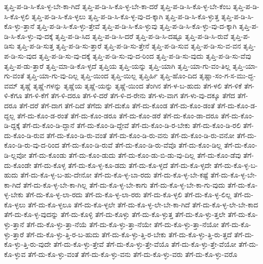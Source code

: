 {ತೃಪ್ತಿ-ಪ-ಡಿ-ಸಿ-ಕೊ-ಳ್ಳ-ಬೇ-ಕಾ-ಗಿದೆ
ತೃಪ್ತಿ-ಪ-ಡಿ-ಸಿ-ಕೊ-ಳ್ಳ-ಬೇ-ಕಾ-ದರೆ
ತೃಪ್ತಿ-ಪ-ಡಿ-ಸಿ-ಕೊ-ಳ್ಳ-ಬೇ-ಕೆಂಬ
ತೃಪ್ತಿ-ಪ-ಡಿ-ಸಿ-ಕೊ-ಳ್ಳಲಿ
ತೃಪ್ತಿ-ಪ-ಡಿ-ಸಿ-ಕೊ-ಳ್ಳಲು
ತೃಪ್ತಿ-ಪ-ಡಿ-ಸಿ-ಕೊ-ಳ್ಳ-ವು-ದ-ಕ್ಕಾಗಿ
ತೃಪ್ತಿ-ಪ-ಡಿ-ಸಿ-ಕೊ-ಳ್ಳುತ್ತ
ತೃಪ್ತಿ-ಪ-ಡಿ-ಸಿ-ಕೊ-ಳ್ಳು-ತ್ತಾನೆ
ತೃಪ್ತಿ-ಪ-ಡಿ-ಸಿ-ಕೊ-ಳ್ಳು-ತ್ತೇವೆ
ತೃಪ್ತಿ-ಪ-ಡಿ-ಸಿ-ಕೊ-ಳ್ಳುವು
ತೃಪ್ತಿ-ಪ-ಡಿ-ಸಿ-ಕೊ-ಳ್ಳು-ವು-ದ-ಕ್ಕಾಗಿ
ತೃಪ್ತಿ-ಪ-ಡಿ-ಸಿ-ಕೊ-ಳ್ಳು-ವು-ದಕ್ಕೆ
ತೃಪ್ತಿ-ಪ-ಡಿ-ಸಿದ
ತೃಪ್ತಿ-ಪ-ಡಿ-ಸಿ-ದರೆ
ತೃಪ್ತಿ-ಪ-ಡಿ-ಸಿ-ದಷ್ಟೂ
ತೃಪ್ತಿ-ಪ-ಡಿ-ಸಿ-ರುವೆ
ತೃಪ್ತಿ-ಪ-ಡಿಸು
ತೃಪ್ತಿ-ಪ-ಡಿ-ಸುತ್ತ
ತೃಪ್ತಿ-ಪ-ಡಿ-ಸು-ತ್ತಾರೆ
ತೃಪ್ತಿ-ಪ-ಡಿ-ಸು-ತ್ತೇನೆ
ತೃಪ್ತಿ-ಪ-ಡಿ-ಸುವ
ತೃಪ್ತಿ-ಪ-ಡಿ-ಸು-ವ-ವನ
ತೃಪ್ತಿ-ಪ-ಡಿ-ಸು-ವುದ
ತೃಪ್ತಿ-ಪ-ಡಿ-ಸು-ವು-ದಕ್ಕೆ
ತೃಪ್ತಿ-ಪ-ಡಿ-ಸು-ವು-ದ-ರಿಂದ
ತೃಪ್ತಿ-ಪ-ಡಿ-ಸು-ವುದು
ತೃಪ್ತಿ-ಪ-ಡಿ-ಸು-ವೆವು
ತೃಪ್ತಿ-ಪ-ಡು-ತ್ತಾರೆ
ತೃಪ್ತಿ-ಮಾ-ಡಿ-ಕೊ-ಳ್ಳದೆ
ತೃಪ್ತಿಯ
ತೃಪ್ತಿ-ಯನ್ನು
ತೃಪ್ತಿ-ಯಾಗಿ
ತೃಪ್ತಿ-ಯಾ-ಗು-ವಂ-ತಿಲ್ಲ
ತೃಪ್ತಿ-ಯಾ-ಗು-ವಂತೆ
ತೃಪ್ತಿ-ಯಾ-ಗು-ವು-ದಿಲ್ಲ
ತೃಪ್ತಿ-ಯಿಂದ
ತೃಪ್ತಿ-ಯಿಲ್ಲ
ತೃಪ್ತಿರ್ಹಿ
ತೃಪ್ತಿ-ಹೊಂ-ದಿದ
ತೃಷ್ಣಾ-ಸಂ-ಗ-ಸ-ಮು-ದ್ಭ-ವಮ್
ತೃಷ್ಣೆ
ತೃಷ್ಣೆ-ಗಳನ್ನು
ತೃಷ್ಣೆಯ
ತೃಷ್ಣೆ-ಯನ್ನು
ತೃಷ್ಣೆ-ಯಿಂದ
ತೆಂಗಿನ
ತೆಗ-ಳ-ಬ-ಹುದು
ತೆಗ-ಳಲಿ
ತೆಗ-ಳಿಕೆ
ತೆಗ-ಳಿ-ಕೆಗೂ
ತೆಗ-ಳಿ-ಕೆಗೆ
ತೆಗ-ಳಿ-ದರೂ
ತೆಗ-ಳಿ-ದರೆ
ತೆಗ-ಳಿ-ದ-ರೇನು
ತೆಗ-ಳು-ವಾಗ
ತೆಗ-ಳು-ವು-ದಕ್ಕೂ
ತೆಗೆದ
ತೆಗೆ-ದರೂ
ತೆಗೆ-ದರೆ
ತೆಗೆ-ದಾಗ
ತೆಗೆ-ದಿದೆ
ತೆಗೆದು
ತೆಗೆ-ದುಕೊ
ತೆಗೆ-ದು-ಕೊಂಡ
ತೆಗೆ-ದು-ಕೊಂ-ಡಂತೆ
ತೆಗೆ-ದು-ಕೊಂ-ಡ-ದ್ದಲ್ಲ
ತೆಗೆ-ದು-ಕೊಂ-ಡ-ರಂತೆ
ತೆಗೆ-ದು-ಕೊಂ-ಡರೂ
ತೆಗೆ-ದು-ಕೊಂ-ಡರೆ
ತೆಗೆ-ದು-ಕೊಂ-ಡಾ-ದರೂ
ತೆಗೆ-ದು-ಕೊಂ-ಡಿ-ದ್ದಕ್ಕೆ
ತೆಗೆ-ದು-ಕೊಂ-ಡಿ-ದ್ದಾನೆ
ತೆಗೆ-ದು-ಕೊಂ-ಡಿ-ದ್ದೇವೆ
ತೆಗೆ-ದು-ಕೊಂ-ಡಿ-ರ-ಬೇಕು
ತೆಗೆ-ದು-ಕೊಂ-ಡಿ-ರಲಿ
ತೆಗೆ-ದು-ಕೊಂ-ಡಿ-ರುವ
ತೆಗೆ-ದು-ಕೊಂ-ಡಿ-ರು-ವಂತೆ
ತೆಗೆ-ದು-ಕೊಂ-ಡಿ-ರು-ವನು
ತೆಗೆ-ದು-ಕೊಂ-ಡಿ-ರು-ವನೋ
ತೆಗೆ-ದು-ಕೊಂ-ಡಿ-ರು-ವು-ದ-ರಿಂದ
ತೆಗೆ-ದು-ಕೊಂ-ಡಿ-ರುವೆ
ತೆಗೆ-ದು-ಕೊಂ-ಡಿ-ರು-ವೆವೊ
ತೆಗೆ-ದು-ಕೊಂ-ಡಿಲ್ಲ
ತೆಗೆ-ದು-ಕೊಂ-ಡಿ-ಲ್ಲವೋ
ತೆಗೆ-ದು-ಕೊಂಡು
ತೆಗೆ-ದು-ಕೊಂ-ಡುದು
ತೆಗೆ-ದು-ಕೊಂ-ಡು-ಬಿ-ಡು-ವು-ದಿಲ್ಲ
ತೆಗೆ-ದು-ಕೊಂ-ಡೆವು
ತೆಗೆ-ದು-ಕೊಂಡೇ
ತೆಗೆ-ದು-ಕೊಳ್ಳ
ತೆಗೆ-ದು-ಕೊ-ಳ್ಳ-ಕೂ-ಡದು
ತೆಗೆ-ದು-ಕೊ-ಳ್ಳದೆ
ತೆಗೆ-ದು-ಕೊ-ಳ್ಳದೇ
ತೆಗೆ-ದು-ಕೊ-ಳ್ಳ-ಬ-ಹುದು
ತೆಗೆ-ದು-ಕೊ-ಳ್ಳ-ಬ-ಹು-ದೇನೋ
ತೆಗೆ-ದು-ಕೊ-ಳ್ಳ-ಬಾ-ರದು
ತೆಗೆ-ದು-ಕೊ-ಳ್ಳ-ಬೇ-ಕಷ್ಟೆ
ತೆಗೆ-ದು-ಕೊ-ಳ್ಳ-ಬೇ-ಕಾ-ಗಿದೆ
ತೆಗೆ-ದು-ಕೊ-ಳ್ಳ-ಬೇ-ಕಾ-ಗಿಲ್ಲ
ತೆಗೆ-ದು-ಕೊ-ಳ್ಳ-ಬೇ-ಕಾಗು
ತೆಗೆ-ದು-ಕೊ-ಳ್ಳ-ಬೇ-ಕಾ-ಗು-ವುದು
ತೆಗೆ-ದು-ಕೊ-ಳ್ಳ-ಬೇಕು
ತೆಗೆ-ದು-ಕೊ-ಳ್ಳ-ಲಾ-ರದು
ತೆಗೆ-ದು-ಕೊ-ಳ್ಳ-ಲಾ-ರರು
ತೆಗೆ-ದು-ಕೊ-ಳ್ಳಲಿ
ತೆಗೆ-ದು-ಕೊ-ಳ್ಳ-ಲಿಲ್ಲ
ತೆಗೆ-ದು-ಕೊ-ಳ್ಳಲು
ತೆಗೆ-ದು-ಕೊ-ಳ್ಳಲೂ
ತೆಗೆ-ದು-ಕೊ-ಳ್ಳಲೇ
ತೆಗೆ-ದು-ಕೊ-ಳ್ಳ-ಲೇ-ಬೇ-ಕಾ-ಗಿದೆ
ತೆಗೆ-ದು-ಕೊ-ಳ್ಳ-ಲೇ-ಬೇ-ಕಾದ
ತೆಗೆ-ದು-ಕೊ-ಳ್ಳ-ವುದನ್ನು
ತೆಗೆ-ದು-ಕೊಳ್ಳಿ
ತೆಗೆ-ದು-ಕೊಳ್ಳು
ತೆಗೆ-ದು-ಕೊ-ಳ್ಳುತ್ತ
ತೆಗೆ-ದು-ಕೊ-ಳ್ಳು-ತ್ತಲೇ
ತೆಗೆ-ದು-ಕೊ-ಳ್ಳು-ತ್ತಾನೆ
ತೆಗೆ-ದು-ಕೊ-ಳ್ಳು-ತ್ತಾ-ನೆಯೆ
ತೆಗೆ-ದು-ಕೊ-ಳ್ಳು-ತ್ತಾ-ನೆಯೇ
ತೆಗೆ-ದು-ಕೊ-ಳ್ಳು-ತ್ತಾ-ನೆಯೋ
ತೆಗೆ-ದು-ಕೊ-ಳ್ಳು-ತ್ತಾರೆ
ತೆಗೆ-ದು-ಕೊ-ಳ್ಳು-ತ್ತಿ-ರ-ಬ-ಹುದು
ತೆಗೆ-ದು-ಕೊ-ಳ್ಳು-ತ್ತಿ-ರ-ಬೇಕು
ತೆಗೆ-ದು-ಕೊ-ಳ್ಳು-ತ್ತಿ-ರು-ತ್ತದೆ
ತೆಗೆ-ದು-ಕೊ-ಳ್ಳು-ತ್ತಿ-ರು-ವುದೇ
ತೆಗೆ-ದು-ಕೊ-ಳ್ಳು-ತ್ತೇವೆ
ತೆಗೆ-ದು-ಕೊ-ಳ್ಳು-ತ್ತೇ-ವೆಯೊ
ತೆಗೆ-ದು-ಕೊ-ಳ್ಳು-ತ್ತೇ-ವೆಯೋ
ತೆಗೆ-ದು-ಕೊ-ಳ್ಳುವ
ತೆಗೆ-ದು-ಕೊ-ಳ್ಳು-ವಂತೆ
ತೆಗೆ-ದು-ಕೊ-ಳ್ಳು-ವನು
ತೆಗೆ-ದು-ಕೊ-ಳ್ಳು-ವರು
ತೆಗೆ-ದು-ಕೊ-ಳ್ಳು-ವರೊ
}
